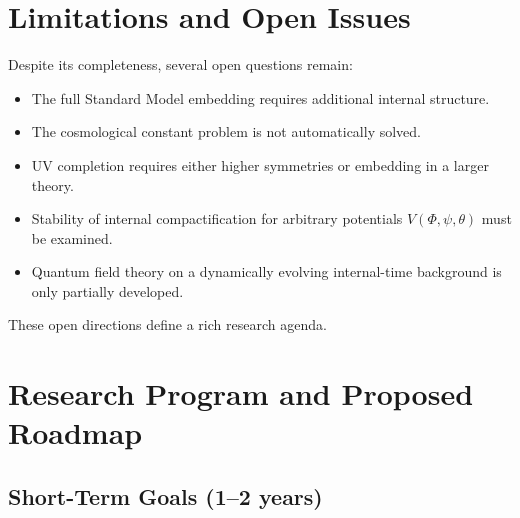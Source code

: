\documentclass[12pt]{article}
\begin{document}

\newpage
\section{Limitations and Open Issues}

Despite its completeness, several open questions remain:

\begin{itemize}
\item The full Standard Model embedding requires additional internal structure.
\item The cosmological constant problem is not automatically solved.
\item UV completion requires either higher symmetries or embedding in a larger theory.
\item Stability of internal compactification for arbitrary potentials \(V(\Phi,\psi,\theta)\) must be examined.
\item Quantum field theory on a dynamically evolving internal-time background is only partially developed.
\end{itemize}

These open directions define a rich research agenda.


\newpage
\section{Research Program and Proposed Roadmap}

\subsection{Short-Term Goals (1--2 years)}
\end{document}
